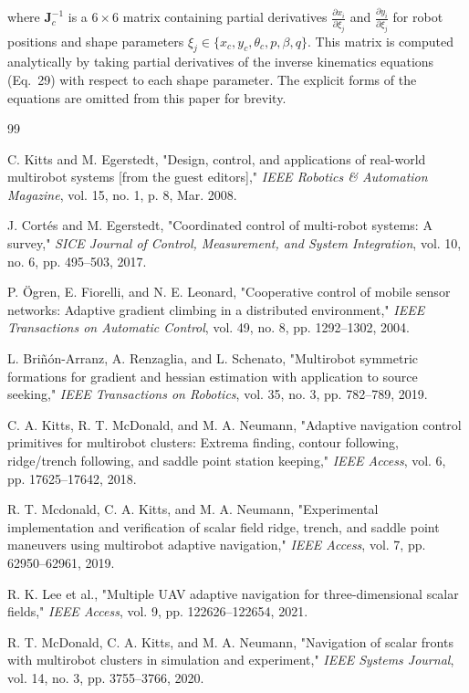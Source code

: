 \documentclass[lettersize,journal]{IEEEtran}
\begin{document}
where $\mathbf{J}_c^{-1}$ is a $6 \times 6$ matrix containing partial derivatives $\frac{\partial x_i}{\partial \xi_j}$ and $\frac{\partial y_i}{\partial \xi_j}$ for robot positions and shape parameters $\xi_j \in \{x_c, y_c, \theta_c, p, \beta, q\}$. This matrix is computed analytically by taking partial derivatives of the inverse kinematics equations (Eq.~29) with respect to each shape parameter. The explicit forms of the equations are omitted from this paper for brevity.


\balance
\begin{thebibliography}{99}

 C. Kitts and M. Egerstedt, "Design, control, and applications of real-world multirobot systems [from the guest editors]," \textit{IEEE Robotics \& Automation Magazine}, vol. 15, no. 1, p. 8, Mar. 2008.


 J. Cortés and M. Egerstedt, "Coordinated control of multi-robot systems: A survey," \textit{SICE Journal of Control, Measurement, and System Integration}, vol. 10, no. 6, pp. 495--503, 2017.

 P. Ögren, E. Fiorelli, and N. E. Leonard, "Cooperative control of mobile sensor networks: Adaptive gradient climbing in a distributed environment," \textit{IEEE Transactions on Automatic Control}, vol. 49, no. 8, pp. 1292--1302, 2004.

 L. Briñón-Arranz, A. Renzaglia, and L. Schenato, "Multirobot symmetric formations for gradient and hessian estimation with application to source seeking," \textit{IEEE Transactions on Robotics}, vol. 35, no. 3, pp. 782--789, 2019.

 C. A. Kitts, R. T. McDonald, and M. A. Neumann, "Adaptive navigation control primitives for multirobot clusters: Extrema finding, contour following, ridge/trench following, and saddle point station keeping," \textit{IEEE Access}, vol. 6, pp. 17625--17642, 2018.

 R. T. Mcdonald, C. A. Kitts, and M. A. Neumann, "Experimental implementation and verification of scalar field ridge, trench, and saddle point maneuvers using multirobot adaptive navigation," \textit{IEEE Access}, vol. 7, pp. 62950--62961, 2019.

 R. K. Lee et al., "Multiple UAV adaptive navigation for three-dimensional scalar fields," \textit{IEEE Access}, vol. 9, pp. 122626--122654, 2021.

 R. T. McDonald, C. A. Kitts, and M. A. Neumann, "Navigation of scalar fronts with multirobot clusters in simulation and experiment," \textit{IEEE Systems Journal}, vol. 14, no. 3, pp. 3755--3766, 2020.


\end{thebibliography}
\end{document}
